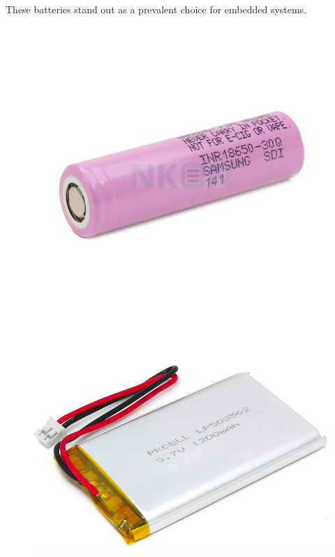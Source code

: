 These batteries stand out as a prevalent choice for embedded systems.
\begin{figure}[H]
    \centering
    \begin{minipage}{.5\textwidth}
        \centering
        \includegraphics[width=.5\linewidth]{ch3/assets/18650.jpg}
        \label{fig:18650}
    \end{minipage}%
    \begin{minipage}{.5\textwidth}
        \centering
        \includegraphics[width=.5\linewidth]{ch3/assets/lipo.png}
        \label{fig:lipo}
    \end{minipage}
\end{figure}

